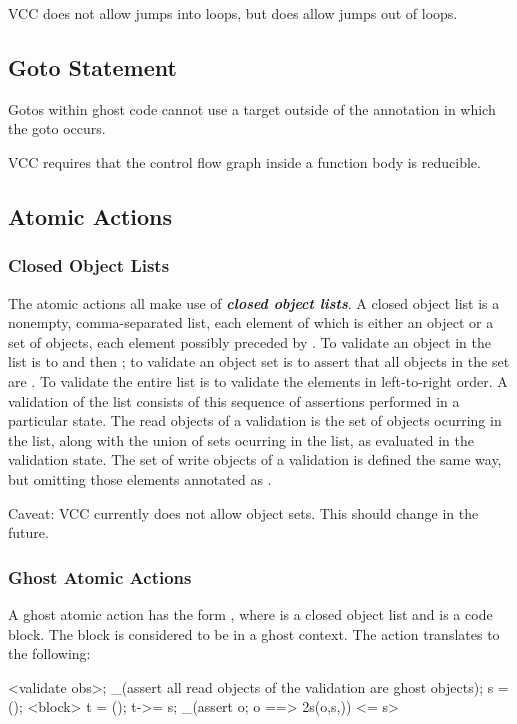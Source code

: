 \documentclass[preprint,nocopyrightspace]{sigplanconf}
\newcommand{\Def}[1]{\textit{\textbf{#1}}}
\begin{document}
{{{VCC does not allow jumps into loops, but does allow jumps out of
loops.

\subsection{Goto Statement}
Gotos within ghost code cannot use a target outside of
the  annotation in which the goto occurs.

VCC requires that the control flow graph inside a function body is
reducible. 

\subsection{Atomic Actions}

\subsubsection{Closed Object Lists}
The atomic actions all make use of \Def{closed object lists}. A closed
object list is a nonempty, comma-separated list, each element of which is either
an object or a set of objects, each element possibly preceded
by . To validate an object  in the list is to 
 and then ;
to validate an object set is to assert that all
objects in the set are \vcc{\closed}. To validate the entire list is
to validate the elements in left-to-right order. A validation of the
list consists of this sequence of assertions performed in a particular
state. The read objects of a validation is the set of objects ocurring
in the list, along with the union of sets ocurring in the list, as
evaluated in the validation state. The set of write objects of a validation
is defined the same way, but omitting those elements annotated
as . 

Caveat: VCC currently does not allow object sets. This should change
in the future.

\subsubsection{Ghost Atomic Actions}
A ghost atomic action has the form ,
where  is a closed object list and  is a code
block. The block is considered to be in a ghost context. 
The action translates to the following:

\begin{VCC}
<validate obs>;
_(assert all read objects of the validation are ghost objects);
\state s = \now();
<block>
\state t = \now();
t->\last = s;
_(assert \forall \object o; o 
  ==> \inv2s(o,s,\now))
<\last = s>
\end{VCC}

}}}
\end{document}
